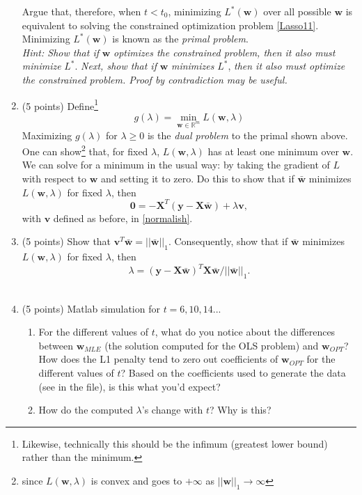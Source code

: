 \documentclass[english]{article}
\begin{document}
\begin{enumerate}
Argue that, therefore, when $t<t_0$, minimizing $L^*(\mathbf{w})$ over all possible $\mathbf{w}$ is equivalent to solving the constrained optimization problem \ref{Lasso11}. Minimizing $L^*(\mathbf{w})$ is known as the \emph{primal problem}.\\
\emph{Hint: Show that if} $\mathbf{w}$ \emph{optimizes the constrained problem, then it also must minimize} $L^*$. \emph{Next, show that if} $\mathbf{w}$ \emph{minimizes} $L^*$, \emph{then it also must optimize the constrained problem. Proof by contradiction may be useful.}


\item (5 points) Define\footnote{Likewise, technically this should be the infimum (greatest lower bound) rather than the minimum.}
\begin{equation}\label{dual}
\displaystyle g (\lambda) =\min_{\mathbf{w} \in \mathbb{R}^m} L(\mathbf{w}, \lambda)
\end{equation}
Maximizing $g (\lambda)$ for $\lambda \ge 0$ is the \emph{dual problem} to the primal shown above.\\
	
One can show\footnote{since $L(\mathbf{w}, \lambda)$ is convex and goes to $+\infty$ as $||\mathbf{w}||_1\to\infty$} that, for fixed $\lambda$, $L(\mathbf{w},\lambda)$ has at least one minimum over $\mathbf{w}$. We can solve for a minimum in the usual way: by taking the gradient of $L$ with respect to $\mathbf{w}$ and setting it to zero. Do this to show that if $\bar{\mathbf{w}}$ minimizes $L(\mathbf{w}, \lambda)$ for fixed $\lambda$, then
\begin{equation}\label{normalish2}
\displaystyle \mathbf{0} = -\mathbf{X}^T(\mathbf{y}-\mathbf{X}\bar{\mathbf{w}}) + \lambda \mathbf{v},
\end{equation}
with $\mathbf{v}$ defined as before, in \ref{normalish}.\\

\item (5 points) Show that $\mathbf{v}^T\bar{\mathbf{w}} = ||\bar{\mathbf{w}}||_1$. Consequently, show that if $\bar{\mathbf{w}}$ minimizes $L(\mathbf{w}, \lambda)$ for fixed $\lambda$, then 
\begin{equation}\label{wlambdarelation}
\lambda = (\mathbf{y}-\mathbf{X}\bar{\mathbf{w}})^T\mathbf{X}\bar{\mathbf{w}}/||\bar{\mathbf{w}}||_1.
\end{equation}\\

\item (5 points) Matlab simulation for $t=6,10,14$...
	\begin{enumerate}
	\item For the different values of $t$, what do you notice about the differences between $\mathbf{w}_{MLE}$ (the solution computed for the OLS problem) and $\mathbf{w}_{OPT}$? How does the L1 penalty tend to zero out coefficients of $\mathbf{w}_{OPT}$ for the different values of $t$? Based on the coefficients used to generate the data (see in the file), is this what you'd expect? 
	\item How do the computed $\lambda$'s change with $t$? Why is this?

	\end{enumerate}

\end{enumerate}
\end{document}
